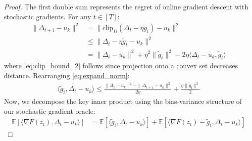 \documentclass[letterpaper]{article} %
\newcommand{\1}{\mathbf{1}}
\begin{document}
\begin{proof}
The first double sum represents the regret of online gradient descent with stochastic gradients. For any $t \in [T]$:
\begin{align}
\|\Delta_{t+1} - u_k\|^2 &= \|\text{clip}_D(\Delta_t - \eta\tilde{g}_t) - u_k\|^2 \label{eq:clip_bound_1}\\
&\leq \|\Delta_t - \eta\tilde{g}_t - u_k\|^2 \label{eq:clip_bound_2}\\
&= \|\Delta_t - u_k\|^2 + \eta^2\|\tilde{g}_t\|^2 - 2\eta\langle \Delta_t - u_k, \tilde{g}_t \rangle \label{eq:expand_norm}
\end{align}
where \eqref{eq:clip_bound_2} follows since projection onto a convex set decreases distance. Rearranging \eqref{eq:expand_norm}:
\begin{align}
\langle \tilde{g}_t, \Delta_t - u_k \rangle \leq \frac{\|\Delta_t - u_k\|^2 - \|\Delta_{t+1} - u_k\|^2}{2\eta} + \frac{\eta\|\tilde{g}_t\|^2}{2} \label{eq:rearrange}
\end{align}
Now, we decompose the key inner product using the bias-variance structure of our stochastic gradient oracle:
\begin{align}
\mathbb{E}[\langle \nabla F(z_t), \Delta_t - u_k \rangle] &= \mathbb{E}[\langle \tilde{g}_t, \Delta_t - u_k \rangle] + \mathbb{E}[\langle \nabla F(z_t) - \tilde{g}_t, \Delta_t - u_k \rangle] \label{eq:decomp_inner}
\end{align}


\end{proof}
\end{document}
